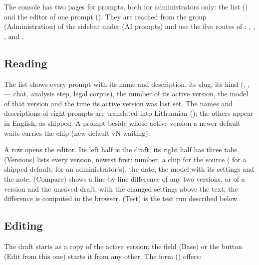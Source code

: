 The console has two pages for prompts, both for administrators only: the list
() and the editor of one prompt
(). They are reached from the group 
(Administration) of the sidebar under  (AI prompts) and use the five
routes of :
, ,
,
 and
.

\subsection{Reading}\label{sec:prompts:reading}

The list shows every prompt with its name and description, its slug, its kind
(, ,  — chat, analysis step, legal
corpus), the number of its active version, the model of that version and the time its active
version was last set. The names and descriptions of eight prompts are translated into Lithuanian
(); the others appear in English, as shipped. A prompt beside whose active version a newer default waits carries the chip
 (new default vN waiting).

A row opens the editor. Its left half is the draft; its right half has three tabs.
 (Versions) lists every version, newest first: number, a chip for the source
( for a shipped default,  for an administrator's), the
date, the model with its settings and the note.  (Compare) shows a line-by-line
difference of any two versions, or of a version and the unsaved draft, with the changed
settings above the text; the difference is computed in the browser.  (Test) is
the test run described below.

\subsection{Editing}\label{sec:prompts:editing}

The draft starts as a copy of the active version; the field  (Base) or the
button  (Edit from this one) starts it from any other. The form
() offers:

